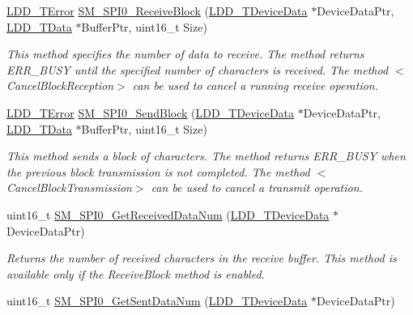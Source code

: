 \begin{DoxyCompactItemize}
\hyperlink{group___p_e___types__module_ga24c2b045fd04e79e85f261ce4df35588}{L\-D\-D\-\_\-\-T\-Error} \hyperlink{group___s_m___s_p_i0__module_gaa40f4d13fea51ef3bbe1ce1168a7bdc8}{S\-M\-\_\-\-S\-P\-I0\-\_\-\-Receive\-Block} (\hyperlink{group___p_e___types__module_gac5cf1362f1f0e3a2ce71b1bf2276d091}{L\-D\-D\-\_\-\-T\-Device\-Data} $\ast$Device\-Data\-Ptr, \hyperlink{group___p_e___types__module_gade8ef9401405bd941b6da738b807f980}{L\-D\-D\-\_\-\-T\-Data} $\ast$Buffer\-Ptr, uint16\-\_\-t Size)
\begin{DoxyCompactList}\small\item\em This method specifies the number of data to receive. The method returns E\-R\-R\-\_\-\-B\-U\-S\-Y until the specified number of characters is received. The method $<$\-Cancel\-Block\-Reception$>$ can be used to cancel a running receive operation. \end{DoxyCompactList}\item 
\hyperlink{group___p_e___types__module_ga24c2b045fd04e79e85f261ce4df35588}{L\-D\-D\-\_\-\-T\-Error} \hyperlink{group___s_m___s_p_i0__module_ga9b87283c09356cd586673974287aa05b}{S\-M\-\_\-\-S\-P\-I0\-\_\-\-Send\-Block} (\hyperlink{group___p_e___types__module_gac5cf1362f1f0e3a2ce71b1bf2276d091}{L\-D\-D\-\_\-\-T\-Device\-Data} $\ast$Device\-Data\-Ptr, \hyperlink{group___p_e___types__module_gade8ef9401405bd941b6da738b807f980}{L\-D\-D\-\_\-\-T\-Data} $\ast$Buffer\-Ptr, uint16\-\_\-t Size)
\begin{DoxyCompactList}\small\item\em This method sends a block of characters. The method returns E\-R\-R\-\_\-\-B\-U\-S\-Y when the previous block transmission is not completed. The method $<$\-Cancel\-Block\-Transmission$>$ can be used to cancel a transmit operation. \end{DoxyCompactList}\item 
uint16\-\_\-t \hyperlink{group___s_m___s_p_i0__module_ga75fcf5c97e9a44e09d39432681b58589}{S\-M\-\_\-\-S\-P\-I0\-\_\-\-Get\-Received\-Data\-Num} (\hyperlink{group___p_e___types__module_gac5cf1362f1f0e3a2ce71b1bf2276d091}{L\-D\-D\-\_\-\-T\-Device\-Data} $\ast$Device\-Data\-Ptr)
\begin{DoxyCompactList}\small\item\em Returns the number of received characters in the receive buffer. This method is available only if the Receive\-Block method is enabled. \end{DoxyCompactList}\item 
uint16\-\_\-t \hyperlink{group___s_m___s_p_i0__module_gaa73755b2c2178ab635f58fe1a0140cb0}{S\-M\-\_\-\-S\-P\-I0\-\_\-\-Get\-Sent\-Data\-Num} (\hyperlink{group___p_e___types__module_gac5cf1362f1f0e3a2ce71b1bf2276d091}{L\-D\-D\-\_\-\-T\-Device\-Data} $\ast$Device\-Data\-Ptr)

\end{DoxyCompactItemize}
